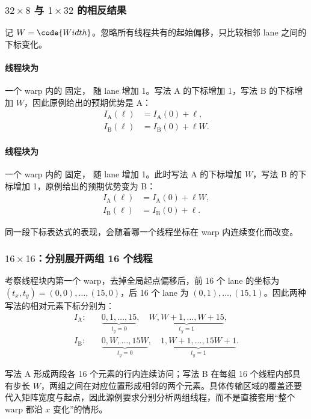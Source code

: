 \subsubsection{\texorpdfstring{$32\times8$}{32x8} 与 \texorpdfstring{$1\times32$}{1x32} 的相反结果}
记 $W=\code{Width}$。忽略所有线程共有的起始偏移，只比较相邻 lane 之间的下标变化。

\paragraph{线程块为 }
一个 warp 内的  固定， 随 lane 增加 1。写法 A 的下标增加 1，写法 B 的下标增加 $W$，因此原例给出的预期优势是 A：
\begin{align}
  I_{\mathrm A}(\ell)&=I_{\mathrm A}(0)+\ell,\\
  I_{\mathrm B}(\ell)&=I_{\mathrm B}(0)+\ell W.
\end{align}

\paragraph{线程块为 }
一个 warp 内的  固定， 随 lane 增加 1。此时写法 A 的下标增加 $W$，写法 B 的下标增加 1，原例给出的预期优势变为 B：
\begin{align}
  I_{\mathrm A}(\ell)&=I_{\mathrm A}(0)+\ell W,\\
  I_{\mathrm B}(\ell)&=I_{\mathrm B}(0)+\ell.
\end{align}

同一段下标表达式的表现，会随着哪一个线程坐标在 warp 内连续变化而改变。

\subsubsection{\texorpdfstring{$16\times16$}{16x16}：分别展开两组 16 个线程}
考察线程块内第一个 warp，去掉全局起点偏移后，前 16 个 lane 的坐标为 $(t_x,t_y)=(0,0),\ldots,(15,0)$，后 16 个 lane 为 $(0,1),\ldots,(15,1)$。因此两种写法的相对元素下标分别为：
\begin{align}
  I_{\mathrm A}:\quad&
  \underbrace{0,1,\ldots,15}_{t_y=0},\quad
  \underbrace{W,W+1,\ldots,W+15}_{t_y=1},\\
  I_{\mathrm B}:\quad&
  \underbrace{0,W,\ldots,15W}_{t_y=0},\quad
  \underbrace{1,W+1,\ldots,15W+1}_{t_y=1}.
\end{align}

写法 A 形成两段各 16 个元素的行内连续访问；写法 B 在每组 16 个线程内部具有步长 $W$，两组之间在对应位置形成相邻的两个元素。具体传输区域的覆盖还要代入矩阵宽度与起点，因此源例要求分别分析两组线程，而不是直接套用“整个 warp 都沿 $x$ 变化”的情形。

